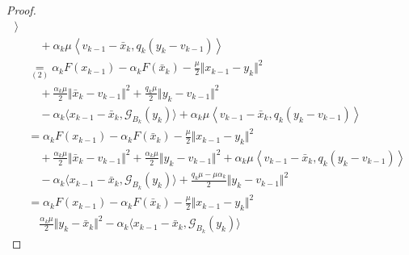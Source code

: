 \documentclass[12pt]{article}
\begin{document}
\begin{proof}
{\begin{align*}
                    \rangle
                    \\&\quad 
                    + \alpha_k \mu
                    \left\langle 
                        v_{k - 1} - \bar x_k, 
                        q_k(y_k - v_{k - 1}) 
                    \right\rangle
                \\
                &\underset{(2)}{=} 
                \alpha_kF(x_{k - 1}) - \alpha_k F(\bar x_k)
                - \frac{\mu}{2}\Vert x_{k - 1} - y_k\Vert^2 
                    \\&\quad 
                    + \frac{\alpha_k \mu}{2}
                    \Vert \bar x_k - v_{k - 1}\Vert^2
                    + \frac{q_k\mu}{2}\Vert y_k - v_{k - 1} \Vert^2
                    \\ &\quad 
                    - \alpha_k\langle
                        x_{k - 1} - \bar x_k, 
                        \mathcal G_{B_k}(y_k)
                    \rangle
                    + \alpha_k \mu
                    \left\langle 
                        v_{k - 1} - \bar x_k, 
                        q_k(y_k - v_{k - 1}) 
                    \right\rangle
                \\
                &=
                \alpha_kF(x_{k - 1}) - \alpha_k F(\bar x_k)
                - \frac{\mu}{2}\Vert x_{k - 1} - y_k\Vert^2 
                    \\&\quad 
                    + \frac{\alpha_k \mu}{2}
                    \Vert \bar x_k - v_{k - 1}\Vert^2
                    + \frac{\alpha_k\mu}{2}\Vert y_k - v_{k - 1}\Vert^2
                    + \alpha_k \mu
                    \left\langle 
                        v_{k - 1} - \bar x_k, 
                        q_k(y_k - v_{k - 1}) 
                    \right\rangle
                    \\ &\quad 
                    - \alpha_k\langle
                        x_{k - 1} - \bar x_k, 
                        \mathcal G_{B_k}(y_k)
                    \rangle
                    + \frac{q_k\mu - \mu\alpha_k}{2}\Vert y_k - v_{k - 1} \Vert^2
                \\
                &= 
                \alpha_kF(x_{k - 1}) - \alpha_k F(\bar x_k)
                - \frac{\mu}{2}\Vert x_{k - 1} - y_k\Vert^2 
                    \\&\quad 
                    \frac{\alpha_k\mu}{2}\Vert y_k - \bar x_k\Vert^2
                    - \alpha_k\langle
                        x_{k - 1} - \bar x_k, 
                        \mathcal G_{B_k}(y_k)
                    \rangle

\end{align*}}
\end{proof}
\end{document}
